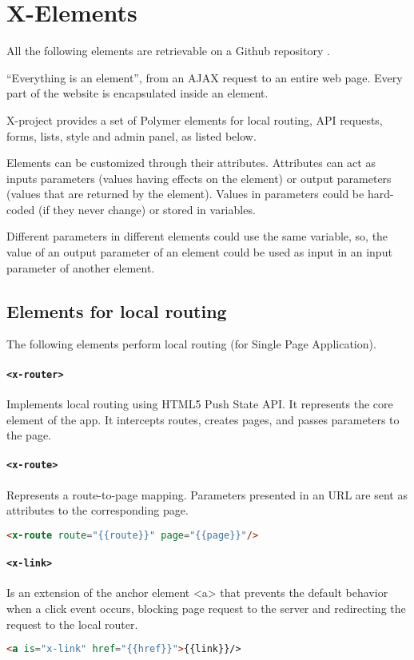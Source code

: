 \section{X-Elements}
\label{sec:XPR_xel}

All the following elements are retrievable on a Github repository \cite{xpr_api}.

``Everything is an element'', from an AJAX request to an entire web page. Every part of the website is encapsulated inside an element.

X-project provides a set of Polymer elements for local routing, API requests, forms, lists, style and admin panel, as listed below.

Elements can be customized through their attributes. Attributes can act as inputs parameters (values having effects on the element) or output parameters (values that are returned by the element). Values in parameters could be hard-coded (if they never change) or stored in variables.

Different parameters in different elements could use the same variable, so, the value of an output parameter of an element could be used as input in an input parameter of another element.

\subsection{Elements for local routing}

The following elements perform local routing (for Single Page Application).
\paragraph{\texttt{<x-router>}} Implements local routing using HTML5 Push State API. It represents the core element of the app. It intercepts routes, creates pages, and passes parameters to the page.
\paragraph{\texttt{<x-route>}} Represents a route-to-page mapping. Parameters presented in an URL are sent as attributes to the corresponding page.
\begin{lstlisting}[language=html]
<x-route route="{{route}}" page="{{page}}"/>
\end{lstlisting}
\paragraph{\texttt{<x-link>}} Is an extension of the anchor element <a> that prevents the default behavior when a click event occurs, blocking page request to the server and redirecting the request to the local router.
\begin{lstlisting}[language=html]
<a is="x-link" href="{{href}}">{{link}}/>
\end{lstlisting}

